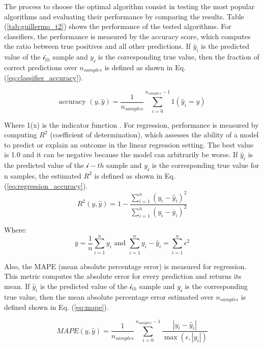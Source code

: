 \documentclass[11pt,landscape]{article}
\begin{document}
\begin{multicols}{3}
The process to choose the optimal algorithm consist in testing the most popular
algorithms and evaluating their performance by comparing the results. Table (\ref{tab:guillermo_t2})
shows the performance of the tested algorithms. For classifiers, the performance
is measured by the accuracy score, which computes the ratio between true
positives and all other predictions. If ${\hat{y}}_i$ is the predicted value of
the $\mathcal{i}_{th}$ sample and $y_{\mathcal{i}}$ is the corresponding true value,
then the fraction of correct predictions over $n_{samples}$ is defined as shown
in Eq. (\ref{eq:classifier_accuracy}).

\begin{equation}
    \textrm{accuracy } (y, \hat{y})=\frac{1}{n_{samples}} \sum_{i=0}^{n_{samples} - 1} 1(\hat{y}_i=y)
    \label{eq:classifier_accuracy}
\end{equation}

Where 1(x) is the indicator function \cite{scikit}. For
regression, performance is measured by computing $R^2$ (coefficient of
determination), which assesses the ability of a model to predict or explain an
outcome in the linear regression setting. The best value is 1.0 and it can be
negative because the model can arbitrarily be worse. If ${\hat{y}}_i$ is the
predicted value of the $\mathcal{i}-th$ sample and $y_{\mathcal{i}}$ is the
corresponding true value for n samples, the estimated $R^2$ is defined as shown in
Eq. (\ref{eq:regression_accuracy}).
\begin{equation}
        R^2(y,\hat{y})=1 - \frac{\sum_{i=1}^{n}(y_i-\hat{y}_i)^2}{\sum_{i=1}^{n}(y_i-\overline{y}_i)^2}
    \label{eq:regression_accuracy}
\end{equation}

Where:
\begin{equation*}
        \overline{y} = \frac{1}{n}\sum_{i=1}^{n}y_i \textrm{ and } \sum_{i=1}^{n}{y_i - \hat{y}_i} = \sum_{i=1}^{n}\epsilon^2
\end{equation*}

Also, the MAPE (mean absolute percentage error) is measured for regression. This
metric computes the absolute error for every prediction and returns its mean. If
${\hat{y}}_i$ is the predicted value of the $\mathcal{i}_{th}$ sample and
$y_{\mathcal{i}}$ is the corresponding true value, then the mean absolute percentage
error estimated over $n_{samples}$ is defined shown in Eq. (\ref{eq:mape}).

\begin{equation}
        MAPE(y,\hat{y})=\frac{1}{n_{samples}}\sum_{i=0}^{n_{samples} - 1}\frac{\left|y_i - \hat{y}_i\right|}{\max(\epsilon,|y_i|)}
        \label{eq:mape}
\end{equation}


\end{multicols}
\end{document}
